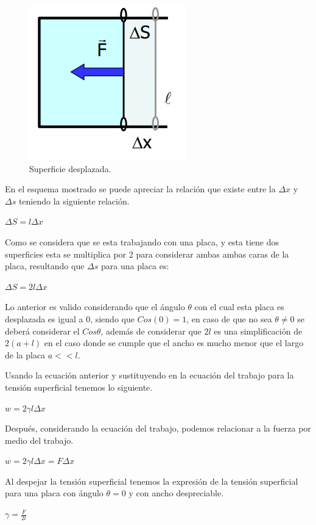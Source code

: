 \documentclass[10pt]{report}
\newcommand{\ec}[1]{\begin{center} $#1$ \end{center}}
\begin{document}
    \begin{figure}[h]
        \centering
        \includegraphics[scale=0.5]{./placa.png}
        \caption{Superficie desplazada.}
    \end{figure}

    En el esquema mostrado se puede apreciar la relación que existe entre la $\Delta x$ y $\Delta s$ teniendo la siguiente relación.

    \ec{\Delta S= l\Delta x}

    Como se considera que se esta trabajando con una placa, y esta tiene dos superficies esta se multiplica por 2 para considerar ambas ambas caras de la placa, resultando que $\Delta s$ para una placa es:

    \ec{\Delta S= 2l\Delta x}   

    Lo anterior es valido considerando que el ángulo $\theta$ con el cual esta placa es desplazada es igual a 0, siendo que $Cos(0)=1$, en caso de que no sea $\theta\neq 0 $ se deberá considerar el $Cos\theta$, además de considerar que $2l$ es una simplificación de $2(a+l)$ en el caso donde se cumple que el ancho es mucho menor que el largo de la placa $a<<l$.

    Usando la ecuación anterior y sustituyendo en la ecuación del trabajo para la tensión superficial tenemos lo siguiente.

    \ec{w = 2\gamma l\Delta x}

    Después, considerando la ecuación del trabajo, podemos relacionar a la fuerza por medio del trabajo.

    \ec{w = 2\gamma l\Delta x = F\Delta x}

    Al despejar la tensión superficial tenemos la expresión de la tensión superficial para una placa con ángulo $\theta=0$ y con ancho despreciable.

    \ec{\gamma = \frac{F}{2l}}
\end{document}

